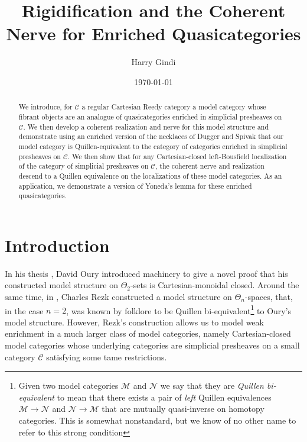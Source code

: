 \documentclass[a4paper]{article}
\title{Rigidification and the Coherent Nerve for Enriched Quasicategories}
\author{Harry Gindi}
\date{\today}
\numberwithin{equation}{subsection}
\theoremstyle{plain}   %
\theoremstyle{definition}
\theoremstyle{remark}
\theoremstyle{plain}
\providecommand{\C}{}
\renewcommand{\C}{\ensuremath{\mathcal{C}}}
\begin{document}
\maketitle

\begin{abstract}
	We introduce, for \(\C\) a regular Cartesian Reedy category a model category whose fibrant objects are an analogue of quasicategories enriched in simplicial presheaves on \(\C\).  We then develop a coherent realization and nerve for this model structure and demonstrate using an enriched version of the necklaces of Dugger and Spivak that our model category is Quillen-equivalent to the category of categories enriched in simplicial presheaves on \(\C\).  We then show that for any Cartesian-closed left-Bousfield localization of the category of simplicial presheaves on \(\C\), the coherent nerve and realization descend to a Quillen equivalence on the localizations of these model categories. As an application, we demonstrate a version of Yoneda's lemma for these enriched quasicategories.
\end{abstract}


\tableofcontents

\clearpage
{}

\section*{Introduction}
\label{sec:intro}
In his thesis \cite{oury}, David Oury introduced machinery to give a novel proof that his constructed model structure on \(\Theta_2\)-sets is Cartesian-monoidal closed. Around the same time, in \cite{rezk-theta-n-spaces}, Charles Rezk constructed a model structure on \(\Theta_n\)-spaces, that, in the case \(n=2\), was known by folklore to be Quillen bi-equivalent\footnote{Given two model categories \(\mathcal{M}\) and \(\mathcal{N}\) we say that they are \emph{Quillen bi-equivalent} to mean that there exists a pair of \emph{left} Quillen equivalences \(\mathcal{M}\to \mathcal{N}\) and \(\mathcal{N}\to \mathcal{M}\) that are mutually quasi-inverse on homotopy categories. This is somewhat nonstandard, but we know of no other name to refer to this strong condition} to Oury's model structure.  However, Rezk's construction allows us to model weak enrichment in a much larger class of model categories, namely Cartesian-closed model categories whose underlying categories are simplicial presheaves on a small category \(\C\) satisfying some tame restrictions.  
\end{document}
